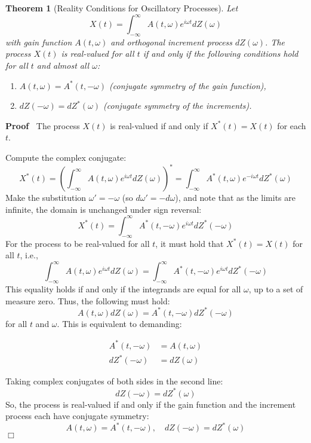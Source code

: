 \documentclass{article}
\newenvironment{proof}{\noindent\textbf{Proof\ }}{\hspace*{\fill}$\Box$\medskip}
\newtheorem{theorem}{Theorem}
\begin{document}
\begin{theorem}
  [Reality Conditions for Oscillatory Processes] Let
  \[ X (t) = \int_{- \infty}^{\infty} A (t, \omega) e^{i \omega t} dZ (\omega)
  \]
  with gain function $A (t, \omega)$ and orthogonal increment process $dZ
  (\omega)$. The process $X (t)$ is real-valued for all $t$ if and only if the
  following conditions hold for all $t$ and almost all $\omega$:
  \begin{enumerate}
    \item $A (t, \omega) = A^{\ast} (t, - \omega)$ {\hspace*{\fill}}(conjugate
    symmetry of the gain function),
    
    \item $dZ (- \omega) = dZ^{\ast} (\omega)$ {\hspace*{\fill}}(conjugate
    symmetry of the increments).
  \end{enumerate}
\end{theorem}

\begin{proof}
  The process $X (t)$ is real-valued if and only if $X^{\ast} (t) = X (t)$ for
  each $t$.
  
  Compute the complex conjugate:
  \[ X^{\ast} (t) = \left( \int_{- \infty}^{\infty} A (t, \omega) e^{i \omega
     t} dZ (\omega) \right)^{\ast} = \int_{- \infty}^{\infty} A^{\ast} (t,
     \omega) e^{- i \omega t} dZ^{\ast} (\omega) \]
  Make the substitution $\omega' = - \omega$ (so $d \omega' = - d \omega$),
  and note that as the limits are infinite, the domain is unchanged under sign
  reversal:
  \[ X^{\ast} (t) = \int_{- \infty}^{\infty} A^{\ast} (t, - \omega) e^{i
     \omega t} dZ^{\ast}  (- \omega) \]
  For the process to be real-valued for all $t$, it must hold that $X^{\ast}
  (t) = X (t)$ for all $t$, i.e.,
  \[ \int_{- \infty}^{\infty} A (t, \omega) e^{i \omega t} dZ (\omega) =
     \int_{- \infty}^{\infty} A^{\ast} (t, - \omega) e^{i \omega t} dZ^{\ast} 
     (- \omega) \]
  This equality holds if and only if the integrands are equal for all
  $\omega$, up to a set of measure zero. Thus, the following must hold:
  \[ A (t, \omega) dZ (\omega) = A^{\ast} (t, - \omega) dZ^{\ast}  (- \omega)
  \]
  for all $t$ and $\omega$. This is equivalent to demanding:
  
  \begin{align*}
    A^{\ast} (t, - \omega) & = A (t, \omega)\\
    dZ^{\ast}  (- \omega) & = dZ (\omega)
  \end{align*}
  
  Taking complex conjugates of both sides in the second line:
  \[ dZ (- \omega) = dZ^{\ast} (\omega) \]
  So, the process is real-valued if and only if the gain function and the
  increment process each have conjugate symmetry:
  \[ A (t, \omega) = A^{\ast} (t, - \omega), \quad dZ (- \omega) = dZ^{\ast}
     (\omega) \]
\end{proof}
\end{document}
